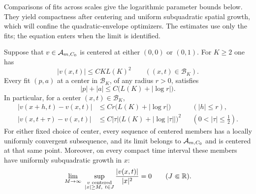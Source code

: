 Comparisons of fits across scales give the logarithmic parameter bounds
below. They yield compactness after centering and uniform subquadratic
spatial growth, which will confine the quadratic-envelope optimizers.
The estimates use only the fits; the equation enters when the limit is
identified.

\begin{lemma}\label{lem:fit-compactness}
Suppose that $v\in\mathcal{A}_{m,C_0}$ is centered at either $(0,0)$ or
$(0,1)$. For $K\ge2$ one has
\begin{equation}\label{eq:centered-growth}
  |v(x,t)|\le C K L(K)^2\qquad ((x,t)\in\mathcal B_K).
\end{equation}
Every fit $(p,a)$ at a center in $\mathcal B_K$, of any radius $r>0$,
satisfies
\begin{equation}\label{eq:fit-parameter-bound}
  |p|+|a|\le C\bigl(L(K)+|\log r|\bigr).
\end{equation}
In particular, for a center $(x,t)\in\mathcal B_K$,
\begin{align}
  |v(x+h,t)-v(x,t)|
    &\le Cr\bigl(L(K)+|\log r|\bigr)
       &&(|h|\le r),\label{eq:spatial-fit-modulus}\\
  |v(x,t+\tau)-v(x,t)|
    &\le C|\tau|\bigl(L(K)+|\log|\tau||\bigr)^2
       &&(0<|\tau|\le\tfrac12).\label{eq:time-fit-modulus}
\end{align}
For either fixed choice of center, every sequence of centered
members has a locally uniformly convergent subsequence, and its
limit belongs to $\mathcal{A}_{m,C_0}$ and is centered at that same
point. Moreover, on every compact time interval these members have
uniformly subquadratic growth in $x$:
\begin{equation}\label{eq:uniform-subquadratic-growth}
  \lim_{M\to\infty}\ 
  \sup_{\substack{v\text{ centered}\\ |x|\ge M,\ t\in J}}
       \frac{|v(x,t)|}{|x|^2}=0
  \qquad(J\Subset\R).
\end{equation}
\end{lemma}

